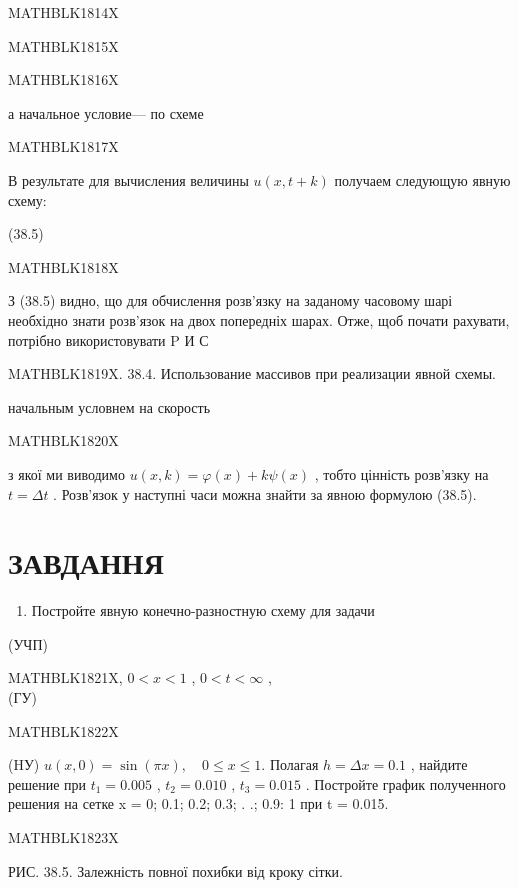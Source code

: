 \documentclass[
  ukrainian,
]{article}
\providecommand{\tightlist}{%
  \setlength{\itemsep}{0pt}\setlength{\parskip}{0pt}}
\begin{document}
MATHBLK1814X

MATHBLK1815X

MATHBLK1816X

а начальное условие--- по схеме

MATHBLK1817X

В результате для вычисления величины \(u(x, t+k)\) получаем следующую
явную схему:

(38.5)

MATHBLK1818X

З (38.5) видно, що для обчислення розв'язку на заданому часовому шарі
необхідно знати розв'язок на двох попередніх шарах. Отже, щоб почати
рахувати, потрібно використовувати P И С

MATHBLK1819X. 38.4. Использование массивов при реализации явной схемы.

начальным условнем на скорость

MATHBLK1820X

з якої ми виводимо \(u(x, k) = \varphi(x) + k\psi(x)\) , тобто цінність
розв'язку на \(t = \Delta t\) . Розв'язок у наступні часи можна знайти
за явною формулою (38.5).

\section{ЗАВДАННЯ}\label{ux437ux430ux432ux434ux430ux43dux43dux44f-2}

\begin{enumerate}
\def\labelenumi{\arabic{enumi}.}
\tightlist
\item
  Постройте явную конечно-разностную схему для задачи
\end{enumerate}

(УЧП)

MATHBLK1821X, \(0 < x < 1\) , \(0 < t < \infty\) ,\\
(ГУ)

MATHBLK1822X

(HУ) \(u(x, 0) = \sin(\pi x), \quad 0 \le x \le 1.\) Полагая
\(h = \Delta x = 0.1\) , найдите решение при \(t_1 = 0.005\) ,
\(t_2 = 0.010\) , \(t_3 = 0.015\) . Постройте график полученного решения
на сетке x = 0; 0.1; 0.2; 0.3; . .; 0.9: 1 при t = 0.015.

MATHBLK1823X

РИС. 38.5. Залежність повної похибки від кроку сітки.
\end{document}
